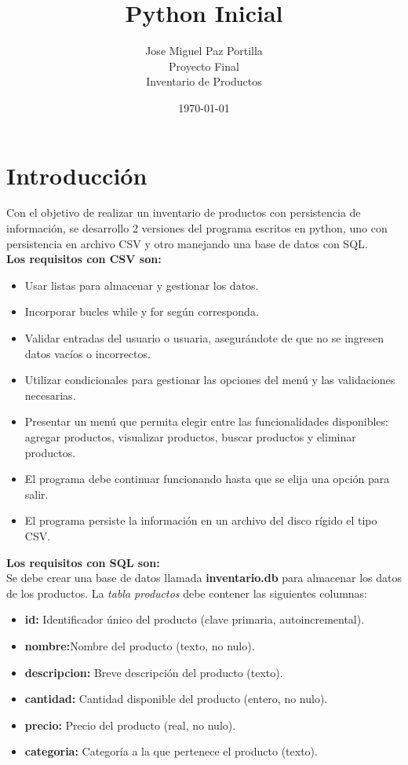 \documentclass[12pt]{article}
\title{Python Inicial}
\author{Jose Miguel Paz Portilla\\Proyecto Final\\Inventario de Productos}
\date{\today}
\begin{document}
\maketitle
\thispagestyle{empty}
\newpage

\tableofcontents
\newpage
\section{Introducción}

Con el objetivo de realizar un inventario de productos con persistencia de información, se desarrollo 2 versiones del programa escritos en python, uno con persistencia en archivo CSV y otro manejando una base de datos con SQL. \\

\textbf{Los requisitos con CSV son:}
\begin{itemize}
	\item Usar listas para almacenar y gestionar los datos.
	\item Incorporar bucles while y for según corresponda. 
	\item Validar entradas del usuario o usuaria, asegurándote de que no se ingresen datos vacíos o incorrectos.
	\item Utilizar condicionales para gestionar las opciones del menú y las validaciones necesarias.
	\item Presentar un menú que permita elegir entre las funcionalidades disponibles: agregar productos, visualizar productos, buscar productos y eliminar productos.
	\item El programa debe continuar funcionando hasta que se elija una opción para salir.
	\item El programa persiste la información en un archivo del disco rígido el tipo CSV.
\end{itemize}

\textbf{Los requisitos con SQL son:}\\

Se debe crear una base de datos llamada \textbf{inventario.db} para almacenar los datos de los productos. La \textit{tabla productos} debe contener las siguientes columnas:

\begin{itemize}
	\item \textbf{id:} Identificador único del producto (clave primaria, autoincremental).
	\item \textbf{nombre:}Nombre del producto (texto, no nulo).
	\item \textbf{descripcion:} Breve descripción del producto (texto).
	\item \textbf{cantidad:} Cantidad disponible del producto (entero, no nulo).
	\item \textbf{precio:} Precio del producto (real, no nulo).
	\item \textbf{categoria:} Categoría a la que pertenece el producto (texto).
\end{itemize}
\end{document}

